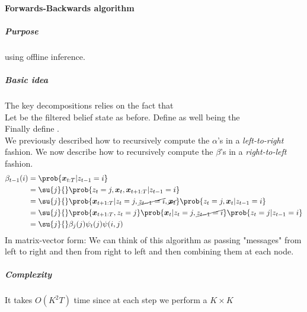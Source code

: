 \paragraph{Forwards-Backwards algorithm}
\subparagraph{Purpose}
 using offline inference.
\subparagraph{Basic idea}
The key decompositions relies on the fact that \\
Let  be the filtered belief state as before.
Define as well  being the \\
Finally define .\\
We previously described how to recursively compute the $\alpha$'s in a \emph{left-to-right} fashion.
We now describe how to recursively compute the $\beta$'s in a \emph{right-to-left} fashion.
\begin{align*}
    \beta_{t-1}(i) &= \prob{\bm{x}_{t:T}|z_{t-1}=i}\\
                   &= \su{j}{}\prob{z_{t}=j,\bm{x}_{t},\bm{x}_{t+1:T}|z_{t-1}=i}\\
                   &= \su{j}{}\prob{\bm{x}_{t+1:T}|z_{t}=j, \cancel{z_{t-1}=i}, \cancel{\bm{x}_{t}}}
                   \prob{z_{t}=j,\bm{x}_{t}|z_{t-1}=i}\\
                   &= \su{j}{}\prob{\bm{x}_{t+1:T},z_{t}=j}\prob{\bm{x}_{t}|z_{t}=j,
                       \cancel{z_{t-1}=i}}\prob{z_{t}=j|z_{t-1}=i}\\
                   &= \su{j}{}\beta_{j}(j)\psi_{t}(j)\psi(i,j)
\end{align*}
In matrix-vector form: 
We can think of this algorithm as passing "messages" from left to right and then from right to
left and then combining them at each node.
\subparagraph{Complexity}
It takes $O(K^{2}T)$ time since at each step we perform a $K\times K$

